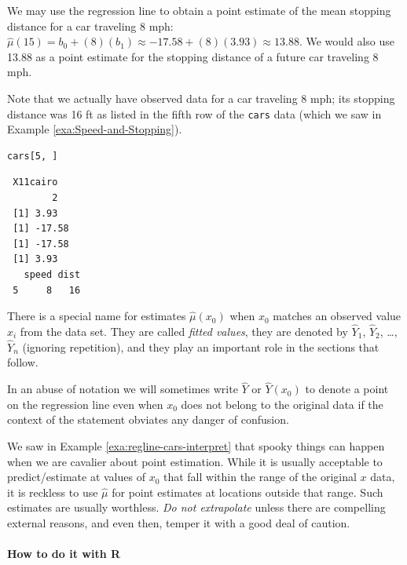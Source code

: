 \documentclass[captions=tableheading]{scrbook}
\begin{document}
\begin{example}
\label{exa:regline-cars-pe-8mph}
We may use the regression line to obtain a point estimate of the mean stopping distance for a car traveling 8 mph: \( \hat{\mu}(15) = b_{0} + (8) (b_{1}) \approx  -17.58 + (8) (  3.93 ) \approx 13.88 \). We would also use 13.88 as a point estimate for the stopping distance of a future car traveling 8 mph. 
\end{example}

Note that we actually have observed data for a car traveling 8 mph; its stopping distance was 16 ft as listed in the fifth row of the \texttt{cars} data (which we saw in Example \ref{exa:Speed-and-Stopping}).


\begin{verbatim}
cars[5, ]
\end{verbatim}

\begin{verbatim}
 X11cairo 
        2
 [1] 3.93
 [1] -17.58
 [1] -17.58
 [1] 3.93
   speed dist
 5     8   16
\end{verbatim}

There is a special name for estimates \( \hat{\mu}(x_{0}) \) when \( x_{0} \) matches an observed value \(x_{i}\) from the data set. They are called \emph{fitted values}, they are denoted by \(\hat{Y}_{1}\), \(\hat{Y}_{2}\), \ldots{}, \(\hat{Y}_{n}\) (ignoring repetition), and they play an important role in the sections that follow. 

In an abuse of notation we will sometimes write \(\hat{Y}\) or \(\hat{Y}(x_{0})\) to denote a point on the regression line even when \(x_{0}\) does not belong to the original data if the context of the statement obviates any danger of confusion.

We saw in Example \ref{exa:regline-cars-interpret} that spooky things can happen when we are cavalier about point estimation. While it is usually acceptable to predict/estimate at values of \(x_{0}\) that fall within the range of the original \(x\) data, it is reckless to use \(\hat{\mu}\) for point estimates at locations outside that range. Such estimates are usually worthless. \emph{Do not extrapolate} unless there are compelling external reasons, and even then, temper it with a good deal of caution.


\paragraph*{How to do it with \textsf{R}}
\end{document}

